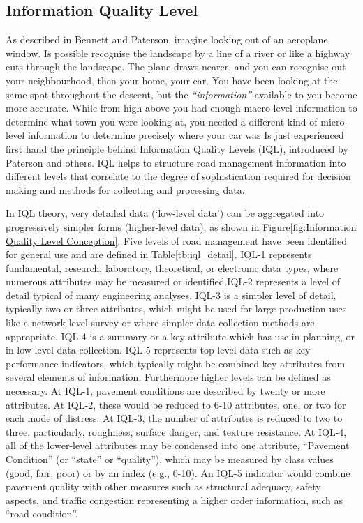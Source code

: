 \documentclass[tesi]{subfiles}
\begin{document}
\subsection{Information Quality Level}\label{ssc:Information Quality Level}
As described in Bennett and Paterson\cite{bennett2000guide}, imagine looking out of an aeroplane window. Is possible recognise the landscape by a line of a river or like a highway cuts through the landscape. The plane draws nearer, and you can recognise out your neighbourhood, then your home, your car. You have been looking at the same spot throughout the descent, but the \textit{“information”} available to you become more accurate. While from high above you had enough macro-level information to determine what town you were looking at, you needed a different kind of micro-level information to determine precisely where your car was
Is just experienced first hand the principle behind Information Quality Levels (IQL), introduced by Paterson and others\cite{paterson2}. IQL helps to structure road management information into different levels that correlate to the degree of sophistication required for decision making and methods for collecting and processing data.


In IQL theory, very detailed data (‘low-level data’) can be aggregated into progressively simpler forms (higher-level data), as shown in Figure\ref{fig:Information Quality Level Conception}. Five levels of road management have been identified for general use and are defined in Table\ref{tb:iql_detail}.
IQL-1 represents fundamental, research, laboratory, theoretical, or electronic data types, where numerous attributes may be measured or identified.IQL-2 represents a level of detail typical of many engineering analyses.
IQL-3 is a simpler level of detail, typically two or three attributes, which might be used for large production uses like a network-level survey or where simpler data collection methods are appropriate.
IQL-4 is a summary or a key attribute which has use in planning, or in low-level data collection.
IQL-5 represents top-level data such as key performance indicators, which typically might be combined key attributes from several elements of information. Furthermore higher levels can be defined as necessary. 
At IQL-1, pavement conditions are described by twenty or more attributes.
At IQL-2, these would be reduced to 6-10 attributes, one, or two for each mode of distress.
 At IQL-3, the number of attributes is reduced to two to three, particularly, roughness, surface danger, and texture resistance.
At IQL-4, all of the lower-level attributes may be condensed into one attribute, “Pavement Condition” (or “state” or “quality”), which may be measured by class values (good, fair, poor) or by an index (e.g., 0-10).
\clearpage An IQL-5 indicator would combine pavement quality with other measures such as structural adequacy, safety aspects, and traffic congestion representing a higher order information, such as “road condition”.
\end{document}
